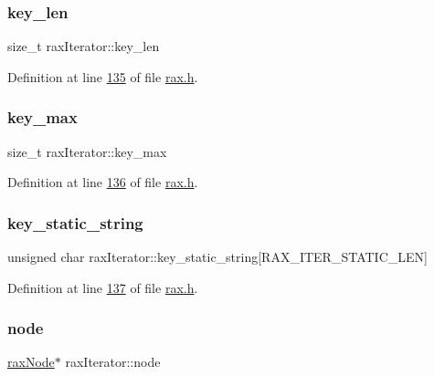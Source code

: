 \subsubsection{\texorpdfstring{key\+\_\+len}{key\_len}}
{\footnotesize\ttfamily size\+\_\+t rax\+Iterator\+::key\+\_\+len}



Definition at line \hyperlink{rax_8h_source_l00135}{135} of file \hyperlink{rax_8h_source}{rax.\+h}.

\mbox{\label{structraxIterator_a0f96b3692272ceee8a2685beed85e146}} 
\subsubsection{\texorpdfstring{key\+\_\+max}{key\_max}}
{\footnotesize\ttfamily size\+\_\+t rax\+Iterator\+::key\+\_\+max}



Definition at line \hyperlink{rax_8h_source_l00136}{136} of file \hyperlink{rax_8h_source}{rax.\+h}.

\mbox{\label{structraxIterator_aaa051abe80ceb44295f450a3f8ca3c62}} 
\subsubsection{\texorpdfstring{key\+\_\+static\+\_\+string}{key\_static\_string}}
{\footnotesize\ttfamily unsigned char rax\+Iterator\+::key\+\_\+static\+\_\+string\mbox{[}R\+A\+X\+\_\+\+I\+T\+E\+R\+\_\+\+S\+T\+A\+T\+I\+C\+\_\+\+L\+EN\mbox{]}}



Definition at line \hyperlink{rax_8h_source_l00137}{137} of file \hyperlink{rax_8h_source}{rax.\+h}.

\mbox{\label{structraxIterator_a0198972a175fc6673af7aef89bc39cc8}} 
\subsubsection{\texorpdfstring{node}{node}}
{\footnotesize\ttfamily \hyperlink{structraxNode}{rax\+Node}$\ast$ rax\+Iterator\+::node}



